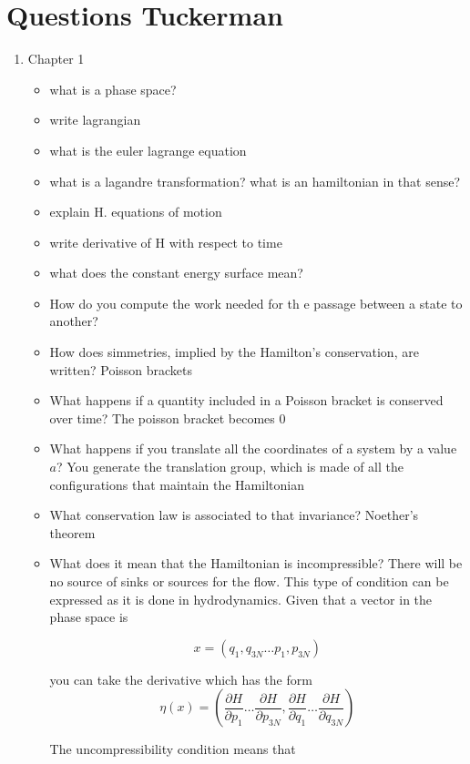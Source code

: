 \section{Questions Tuckerman}

\begin{enumerate}
    \item Chapter 1
    \begin{itemize}
        \item what is a phase space?
        \item write lagrangian
        \item what is the euler lagrange equation
        \item what is a lagandre transformation? what is  an hamiltonian in that sense?
        \item explain H. equations of motion
        \item write derivative of H with respect to time 
        \item what does the constant energy surface mean?
        \item How do you compute the work needed for th e passage between a state to another?
        \item How does simmetries, implied by the Hamilton's conservation, are written? Poisson brackets
        \item What happens if a quantity included in a Poisson bracket is conserved over time? The poisson bracket becomes 0
        \item What happens if you translate all the coordinates of a system by a value $a$? You generate the translation group, which is made of all the configurations that maintain the Hamiltonian
        \item What conservation law is associated to that invariance? Noether's theorem 
        \item What does it mean that the Hamiltonian is incompressible? There will be no source of sinks or sources for the flow. This type of condition can be expressed as it is done in hydrodynamics. Given that a vector in the phase space is

        $$
        x = (q_1, q_{3N} \dots p_1, p_{3N})
        $$

        you can take the derivative which has the form
        $$
        \eta (x) = \left(\frac{\partial H}{\partial p_1} \dots \frac{\partial H}{\partial p_{3N}}, \frac{\partial H}{\partial q_1} \dots \frac{\partial H}{\partial q_{3N}}\right) 
        $$

        The uncompressibility condition means that 


\end{itemize}
\end{enumerate}
